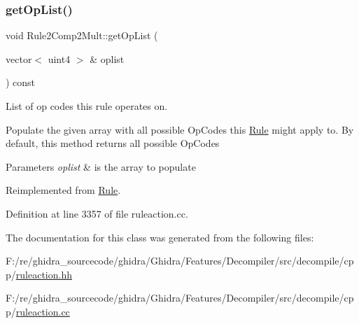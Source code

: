 \subsubsection{\texorpdfstring{getOpList()}{getOpList()}}
{\footnotesize\ttfamily void Rule2\+Comp2\+Mult\+::get\+Op\+List (\begin{DoxyParamCaption}\item[{vector$<$ uint4 $>$ \&}]{oplist }\end{DoxyParamCaption}) const\hspace{0.3cm}{\ttfamily [virtual]}}



List of op codes this rule operates on. 

Populate the given array with all possible Op\+Codes this \mbox{\hyperlink{class_rule}{Rule}} might apply to. By default, this method returns all possible Op\+Codes 
\begin{DoxyParams}{Parameters}
{\em oplist} & is the array to populate \\
\hline
\end{DoxyParams}


Reimplemented from \mbox{\hyperlink{class_rule_a4023bfc7825de0ab866790551856d10e}{Rule}}.



Definition at line 3357 of file ruleaction.\+cc.



The documentation for this class was generated from the following files\+:\begin{DoxyCompactItemize}
\item 
F\+:/re/ghidra\+\_\+sourcecode/ghidra/\+Ghidra/\+Features/\+Decompiler/src/decompile/cpp/\mbox{\hyperlink{ruleaction_8hh}{ruleaction.\+hh}}\item 
F\+:/re/ghidra\+\_\+sourcecode/ghidra/\+Ghidra/\+Features/\+Decompiler/src/decompile/cpp/\mbox{\hyperlink{ruleaction_8cc}{ruleaction.\+cc}}\end{DoxyCompactItemize}
